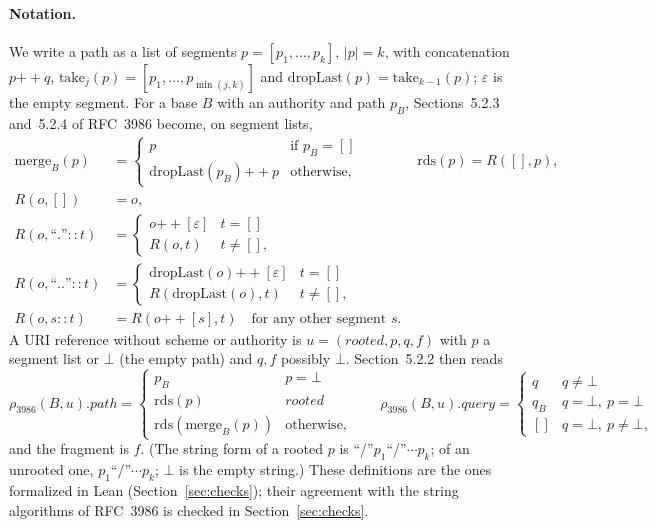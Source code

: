 \documentclass[11pt,a4paper]{article}
\theoremstyle{remark}
\newcommand{\rds}{\mathrm{rds}}
\newcommand{\mergef}{\mathrm{merge}}
\newcommand{\take}[1]{\mathrm{take}_{#1}}
\newcommand{\dl}{\mathrm{dropLast}}
\newcommand{\rfc}{\rho_{3986}}
\newcommand{\e}{\varepsilon}
\newcommand{\seq}[1]{[#1]}
\begin{document}
\paragraph{Notation.} We write a path as a list of segments $p=\seq{p_1,\dots,p_k}$, $|p|=k$, with
concatenation $p\mathbin{+\!\!+}q$, $\take{j}(p)=\seq{p_1,\dots,p_{\min(j,k)}}$ and
$\dl(p)=\take{k-1}(p)$; $\e$ is the empty segment. For a base $B$ with an authority and path $p_B$,
Sections~5.2.3 and~5.2.4 of RFC~3986 become, on segment lists,
\begin{align*}
\mergef_B(p) &= \begin{cases} p & \text{if } p_B=\seq{}\\ \dl(p_B)\mathbin{+\!\!+}p & \text{otherwise,}\end{cases}
\qquad\qquad \rds(p)=R(\seq{},p),\\
R(o,\seq{}) &= o,\\
R(o,\text{``.''}::t) &= \begin{cases} o\mathbin{+\!\!+}\seq{\e} & t=\seq{}\\ R(o,t) & t\neq\seq{},\end{cases}\\
R(o,\text{``..''}::t) &= \begin{cases} \dl(o)\mathbin{+\!\!+}\seq{\e} & t=\seq{}\\ R(\dl(o),t) & t\neq\seq{},\end{cases}\\
R(o,s::t) &= R(o\mathbin{+\!\!+}\seq{s},t)\quad\text{for any other segment } s.
\end{align*}
A URI reference without scheme or authority is $u=(\mathit{rooted},p,q,f)$ with $p$ a segment list or
$\bot$ (the empty path) and $q,f$ possibly $\bot$. Section~5.2.2 then reads
\[
\rfc(B,u).\mathit{path}=\begin{cases} p_B & p=\bot\\ \rds(p) & \mathit{rooted}\\ \rds(\mergef_B(p)) & \text{otherwise,}\end{cases}
\qquad
\rfc(B,u).\mathit{query}=\begin{cases} q & q\neq\bot\\ q_B & q=\bot,\ p=\bot\\ \seq{} & q=\bot,\ p\neq\bot,\end{cases}
\]
and the fragment is $f$. (The string form of a rooted $p$ is ``/''$p_1$``/''$\cdots p_k$; of an
unrooted one, $p_1$``/''$\cdots p_k$; $\bot$ is the empty string.) These definitions are the ones
formalized in Lean (Section~\ref{sec:checks}); their agreement with the string algorithms of RFC~3986
is checked in Section~\ref{sec:checks}.
\end{document}

